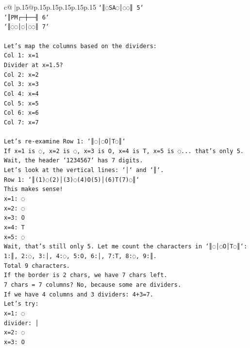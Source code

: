 \documentclass{article}
\begin{document}
{\begin{supertabular}{c@{$\;$}|p{.15\linewidth}@{}p{.15\linewidth}p{.15\linewidth}p{.15\linewidth}p{.15\linewidth}p{.15\linewidth}}
{{{\texttt{`║◌SA◌│◌◌║ 5`} \\
\texttt{`║PM┌─┼──╢ 6`} \\
\texttt{`║◌◌│◌│◌◌║ 7`} \\
\\ 
\texttt{Let's map the columns based on the dividers:} \\
\texttt{Col 1: x=1} \\
\texttt{Divider at x=1.5?} \\
\texttt{Col 2: x=2} \\
\texttt{Col 3: x=3} \\
\texttt{Col 4: x=4} \\
\texttt{Col 5: x=5} \\
\texttt{Col 6: x=6} \\
\texttt{Col 7: x=7} \\
\\ 
\texttt{Let's re{-}examine Row 1: `║◌│◌O│T◌║`} \\
\texttt{If x=1 is ◌, x=2 is ◌, x=3 is O, x=4 is T, x=5 is ◌... that's only 5.} \\
\texttt{Wait, the header `1234567` has 7 digits.} \\
\texttt{Let's look at the vertical lines: `│` and `║`.} \\
\texttt{Row 1: `║(1)◌(2)│(3)◌(4)O(5)│(6)T(7)◌║`} \\
\texttt{This makes sense!} \\
\texttt{x=1: ◌} \\
\texttt{x=2: ◌} \\
\texttt{x=3: O} \\
\texttt{x=4: T} \\
\texttt{x=5: ◌} \\
\texttt{Wait, that's still only 5. Let me count the characters in `║◌│◌O│T◌║`:} \\
\texttt{1:║, 2:◌, 3:│, 4:◌, 5:O, 6:│, 7:T, 8:◌, 9:║.} \\
\texttt{Total 9 characters.} \\
\texttt{If the border is 2 chars, we have 7 chars left.} \\
\texttt{7 chars = 7 columns? No, because some are dividers.} \\
\texttt{If we have 4 columns and 3 dividers: 4+3=7.} \\
\texttt{Let's try:} \\
\texttt{x=1: ◌} \\
\texttt{divider: │} \\
\texttt{x=2: ◌} \\
\texttt{x=3: O} \\
}}}
\end{supertabular}}
\end{document}
